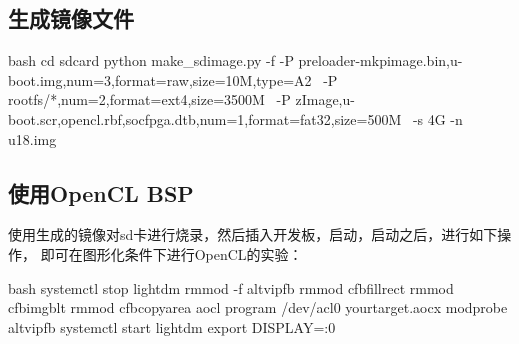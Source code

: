 \subsection{生成镜像文件}
\begin{code-block}{bash}
cd sdcard
python make_sdimage.py -f -P preloader-mkpimage.bin,u-boot.img,num=3,format=raw,size=10M,type=A2 \
    -P rootfs/*,num=2,format=ext4,size=3500M \
    -P zImage,u-boot.scr,opencl.rbf,socfpga.dtb,num=1,format=fat32,size=500M \
    -s 4G -n u18.img
\end{code-block}

\subsection{使用OpenCL BSP}
使用生成的镜像对sd卡进行烧录，然后插入开发板，启动，启动之后，进行如下操作，
即可在图形化条件下进行OpenCL的实验：
\begin{code-block}{bash}
systemctl stop lightdm
rmmod -f altvipfb
rmmod cfbfillrect
rmmod cfbimgblt
rmmod cfbcopyarea
aocl program /dev/acl0 yourtarget.aocx
modprobe altvipfb
systemctl start lightdm
export DISPLAY=:0
\end{code-block}
